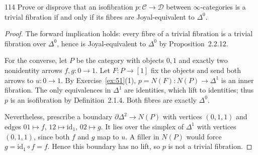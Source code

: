 \begin{exercise}{114}
Prove or disprove that an isofibration $p\colon\mathcal C\to\mathcal D$ between $\infty$-categories is a
trivial fibration if and only if its fibres are Joyal-equivalent to $\Delta^0$.

\begin{proof}
The forward implication holds: every fibre of a trivial fibration is a trivial
fibration over $\Delta^0$, hence is Joyal-equivalent to $\Delta^0$ by
Proposition~2.2.12.

For the converse, let $P$ be the category with objects $0,1$ and exactly two
nonidentity arrows $f,g\colon0\to1$.
Let $F\colon P\to[1]$ fix the objects and send both arrows to
$u\colon0\to1$. By Exercise~\ref{ex:51}(1),
$p=N(F)\colon N(P)\to\Delta^1$ is an inner fibration.
The only equivalences in $\Delta^1$ are identities, which lift to identities;
thus $p$ is an isofibration by Definition~2.1.4.
Both fibres are exactly $\Delta^0$.

Nevertheless, prescribe a boundary $\partial\Delta^2\to N(P)$ with vertices
$(0,1,1)$ and edges $01\mapsto f$, $12\mapsto\mathrm{id}_1$,
$02\mapsto g$. It lies over the simplex of $\Delta^1$ with vertices
$(0,1,1)$, since both $f$ and $g$ map to $u$.
A filler in $N(P)$ would force $g=\mathrm{id}_1\circ f=f$.
Hence this boundary has no lift, so $p$ is not a trivial fibration.
\end{proof}
\end{exercise}
